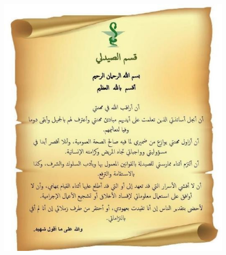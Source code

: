 \begin{figure}[H]
  \includegraphics[width=1.1\textwidth,height=1.4\textwidth]{Images/serment_galien_ar.jpg}
  
\end{figure}


